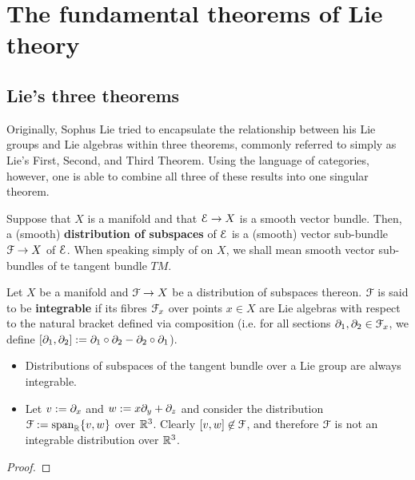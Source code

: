\section{The fundamental theorems of Lie theory}
    \subsection{Lie's three theorems}
        Originally, Sophus Lie tried to encapsulate the relationship between his Lie groups and Lie algebras within three theorems, commonly referred to simply as Lie's First, Second, and Third Theorem. Using the language of categories, however, one is able to combine all three of these results into one singular theorem.
        
        \begin{definition} \label{def: distributionsof_subspaces_on_manifolds}
            Suppose that $X$ is a manifold and that $\mathcal{E} \to X$ is a smooth vector bundle. Then, a (smooth) \textbf{distribution of subspaces} of $\mathcal{E}$ is a (smooth) vector sub-bundle $\mathcal{F} \to X$ of $\mathcal{E}$. When speaking simply of  on $X$, we shall mean smooth vector sub-bundles of te tangent bundle $TM$.
        \end{definition}
        \begin{definition} \label{def: integrability_of_distributions}
            Let $X$ be a manifold and $\mathcal{F} \to X$ be a distribution 
            of subspaces thereon. $\mathcal{F}$ is said to be \textbf{integrable} if its fibres $\mathcal{F}_x$ over points $x \in X$ are Lie algebras with respect to the natural bracket defined via composition (i.e. for all sections $\partial_1, \partial_2 \in \mathcal{F}_x$, we define $[\partial_1, \partial_2] := \partial_1 \circ \partial_2 - \partial_2 \circ \partial_1$). 
        \end{definition}
        \begin{example}
            \noindent
            \begin{itemize}
                \item Distributions of subspaces of the tangent bundle over a Lie group are always integrable.
                \item Let $v := \partial_x$ and $w := x\partial_y + \partial_z$ and consider the distribution $\mathcal{F} := \operatorname{span}_{\mathbb{R}}\{v, w\}$ over $\mathbb{R}^3$. Clearly $[v, w] \not \in \mathcal{F}$, and therefore $\mathcal{F}$ is not an integrable distribution over $\mathbb{R}^3$.
            \end{itemize}
        \end{example}
        \begin{definition} \label{def: integral_submanifolds}
            
        \end{definition}
        \begin{lemma} \label{lemma: an_integrability_criterion_for_distributions}
            
        \end{lemma}
            \begin{proof}
                
            \end{proof}
        
